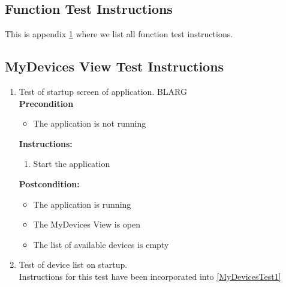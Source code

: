 \documentclass[a4paper]{article}
\newlength{\testlabellength}
\newenvironment{testlist}{\begin{enumerate}[label=\bfseries Instruction \thesubsection.\arabic* , labelindent=0pt, labelwidth=\testlabellength , leftmargin=2cm]}{\end{enumerate}}
\newenvironment{precondition}{
{\color{white}BLARG}\\ 
\textbf{Precondition}
\begin{itemize}[labelindent=0cm, labelwidth=2cm , leftmargin=1cm]
}
{\end{itemize}}
\newenvironment{instruction}{
\textbf{Instructions:}
\begin{enumerate}[label=\bfseries  \arabic*., labelindent=0cm, labelwidth=2cm , leftmargin=1cm]
}
{\end{enumerate}}
\newenvironment{postcondition}{
\textbf{Postcondition:}
\begin{itemize}[labelindent=0cm, labelwidth=2cm , leftmargin=1cm]
}
{\end{itemize}}
\begin{document}
\begin{appendices}

\section{Function Test Instructions} \label{appendix:section:functiontest}
This is appendix \ref{appendix:section:functiontest} where we list all function test instructions.


\subsection{MyDevices View Test Instructions}
\begin{testlist}
    \item Test of startup screen of application. \label{MyDevicesTest1}
    	\begin{precondition}
    		\item The application is not running
    	\end{precondition}
    	\begin{instruction}
			\item Start the application
    	\end{instruction}
    	\begin{postcondition}
    		\item The application is running
    		\item The MyDevices View is open
    		\item The list of available devices is empty
    	\end{postcondition}
    
	\item Test of device list on startup. \\
		Instructions for this test have been incorporated into \ref{MyDevicesTest1}  


\end{testlist}
\end{appendices}
\end{document}
